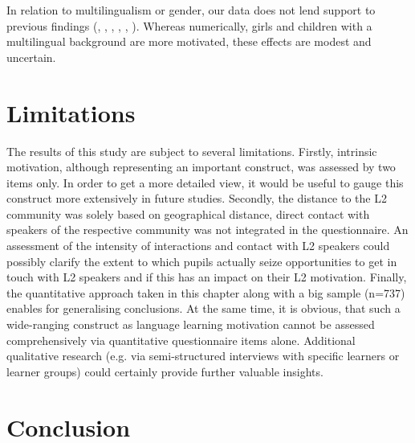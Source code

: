 \documentclass[output=paper]{langsci/langscibook}
\begin{document}
In relation to multilingualism or gender, our data does not lend support to previous findings (\citealt{DoernyeiCsizer2002}, \citealt{Holder2005}, \citealt{Heinzmann2009,Heinzmann2010}, \citealt{BruehwilerLePapeRacine2017}, \citealt{Henry2009}, \citealt{CourtneyEtAl2017}). Whereas numerically, girls and children with a multilingual background are more motivated, these effects are modest and uncertain.

\section{Limitations}

The results of this study are subject to several limitations. Firstly, intrinsic motivation, although representing an important construct, was assessed by two items only. In order to get a more detailed view, it would be useful to gauge this construct more extensively in future studies. Secondly, the distance to the L2 community was solely based on geographical distance, direct contact with speakers of the respective community was not integrated in the questionnaire. An assessment of the intensity of interactions and contact with L2 speakers could possibly clarify the extent to which pupils actually seize opportunities to get in touch with L2 speakers and if this has an impact on their L2 motivation. Finally, the quantitative approach taken in this chapter along with a big sample (n=737) enables for generalising conclusions. At the same time, it is obvious, that such a wide-ranging construct as language learning motivation cannot be assessed comprehensively via quantitative questionnaire items alone. Additional qualitative research (e.g. via semi-structured interviews with specific learners or learner groups) could certainly provide further valuable insights.

\section{Conclusion}
\end{document}
